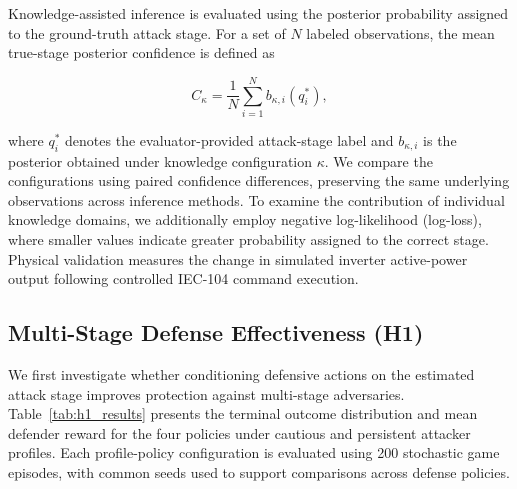 \documentclass[10pt,conference]{IEEEtran}
\begin{document}
Knowledge-assisted inference is evaluated using the posterior probability assigned to the ground-truth attack stage. For a set of $N$ labeled observations, the mean true-stage posterior confidence is defined as

\begin{equation}
C_{\kappa} =
\frac{1}{N}
\sum_{i=1}^{N}
b_{\kappa,i}(q_i^{*}),
\label{eq:stage_confidence}
\end{equation}

\noindent
where $q_i^{*}$ denotes the evaluator-provided attack-stage label and $b_{\kappa,i}$ is the posterior obtained under knowledge configuration $\kappa$. We compare the configurations using paired confidence differences, preserving the same underlying observations across inference methods. To examine the contribution of individual knowledge domains, we additionally employ negative log-likelihood (log-loss), where smaller values indicate greater probability assigned to the correct stage. Physical validation measures the change in simulated inverter active-power output following controlled IEC-104 command execution.

\subsection{Multi-Stage Defense Effectiveness (H1)}

We first investigate whether conditioning defensive actions on the estimated attack stage improves protection against multi-stage adversaries. Table~\ref{tab:h1_results} presents the terminal outcome distribution and mean defender reward for the four policies under cautious and persistent attacker profiles. Each profile-policy configuration is evaluated using 200 stochastic game episodes, with common seeds used to support comparisons across defense policies.
\end{document}

